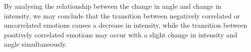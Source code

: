 \documentclass[10pt,journal,cspaper,compsoc]{IEEEtran}
\begin{document}

By analysing the relationship between the change in angle and change in intensity, we may conclude that the transition between negatively correlated or uncorrelated emotions causes a decrease in intensity, while the transition between positively correlated emotions may occur with a slight change in intensity and angle simultaneously. 

\end{document}
